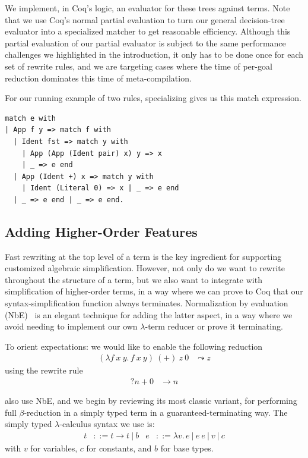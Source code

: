 We implement, in Coq's logic, an evaluator for these trees against terms.
Note that we use Coq's normal partial evaluation to turn our general decision-tree evaluator into a specialized matcher to get reasonable efficiency.
Although this partial evaluation of our partial evaluator is subject to the same performance challenges we highlighted in the introduction, it only has to be done once for each set of rewrite rules, and we are targeting cases where the time of per-goal reduction dominates this time of meta-compilation.

For our running example of two rules, specializing gives us this match expression.
\begin{verbatim}
match e with
| App f y => match f with
  | Ident fst => match y with
    | App (App (Ident pair) x) y => x
    | _ => e end
  | App (Ident +) x => match y with
    | Ident (Literal 0) => x | _ => e end
  | _ => e end | _ => e end.
\end{verbatim}

\subsection{Adding Higher-Order Features} \label{sec:thunk-eval-subst-term}

Fast rewriting at the top level of a term is the key ingredient for supporting customized algebraic simplification.
However, not only do we want to rewrite throughout the structure of a term, but we also want to integrate with simplification of higher-order terms, in a way where we can prove to Coq that our syntax-simplification function always terminates.
Normalization by evaluation (NbE)~\cite{NbE} is an elegant technique for adding the latter aspect, in a way where we avoid needing to implement our own $\lambda$-term reducer or prove it terminating.

To orient expectations: we would like to enable the following reduction
\begin{align*}
  (\lambda f\ x\ y.\, f\ x\ y)\ (+)\ z\ 0 & \leadsto z
\end{align*}
\noindent using the rewrite rule
\begin{align*}
  ?n + 0 & \to n
\end{align*}

\textcite{Aehlig} also use NbE, and we begin by reviewing its most classic variant, for performing full $\beta$-reduction in a simply typed term in a guaranteed-terminating way.
The simply typed $\lambda$-calculus syntax we use is:
\begin{align*}
  t & ::= t \to t ~|~ b
  & e & ::= \lambda v.\, e ~|~ e~e ~|~ v ~|~ c
\end{align*}
\noindent with $v$ for variables, $c$ for constants, and $b$ for base types.

